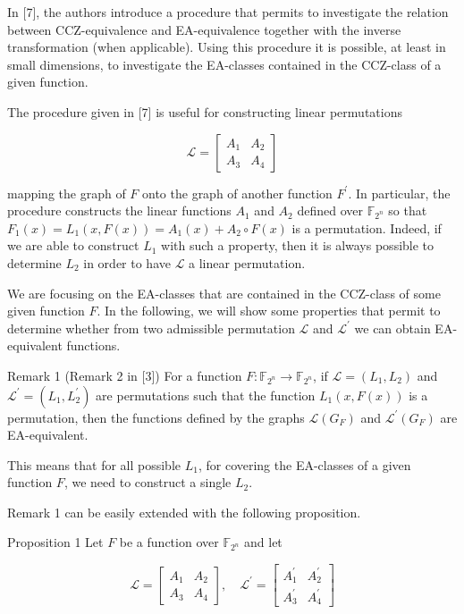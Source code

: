 \documentclass[10pt]{article}
\begin{document}
In [7], the authors introduce a procedure that permits to investigate the relation between CCZ-equivalence and EA-equivalence together with the inverse transformation (when applicable). Using this procedure it is possible, at least in small dimensions, to investigate the EA-classes contained in the CCZ-class of a given function.

The procedure given in [7] is useful for constructing linear permutations

$$
\mathscr{L}=\left[\begin{array}{ll}
A_{1} & A_{2} \\
A_{3} & A_{4}
\end{array}\right]
$$

mapping the graph of $F$ onto the graph of another function $F^{\prime}$. In particular, the procedure constructs the linear functions $A_{1}$ and $A_{2}$ defined over $\mathbb{F}_{2^{n}}$ so that $F_{1}(x)=L_{1}(x, F(x))= A_{1}(x)+A_{2} \circ F(x)$ is a permutation. Indeed, if we are able to construct $L_{1}$ with such a property, then it is always possible to determine $L_{2}$ in order to have $\mathscr{L}$ a linear permutation.

We are focusing on the EA-classes that are contained in the CCZ-class of some given function $F$. In the following, we will show some properties that permit to determine whether from two admissible permutation $\mathscr{L}$ and $\mathscr{L}^{\prime}$ we can obtain EA-equivalent functions.

Remark 1 (Remark 2 in [3]) For a function $F: \mathbb{F}_{2^{n}} \rightarrow \mathbb{F}_{2^{n}}$, if $\mathscr{L}=\left(L_{1}, L_{2}\right)$ and $\mathscr{L}^{\prime}= \left(L_{1}, L_{2}^{\prime}\right)$ are permutations such that the function $L_{1}(x, F(x))$ is a permutation, then the functions defined by the graphs $\mathscr{L}\left(G_{F}\right)$ and $\mathscr{L}^{\prime}\left(G_{F}\right)$ are EA-equivalent.

This means that for all possible $L_{1}$, for covering the EA-classes of a given function $F$, we need to construct a single $L_{2}$.

Remark 1 can be easily extended with the following proposition.

Proposition 1 Let $F$ be a function over $\mathbb{F}_{2^{n}}$ and let

$$
\mathscr{L}=\left[\begin{array}{ll}
A_{1} & A_{2} \\
A_{3} & A_{4}
\end{array}\right], \quad \mathscr{L}^{\prime}=\left[\begin{array}{ll}
A_{1}^{\prime} & A_{2}^{\prime} \\
A_{3}^{\prime} & A_{4}^{\prime}
\end{array}\right]
$$
\end{document}
